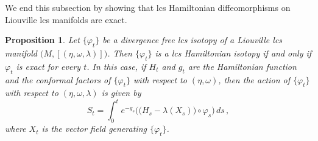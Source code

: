 \documentclass{amsart}
\newtheorem{prop}[thm]{Proposition}
\theoremstyle{remark}
\begin{document}
We end this subsection by showing that
lcs Hamiltonian diffeomorphisms
on Liouville lcs manifolds
are exact.

\begin{prop}\label{proposition: Hamiltonian vs exact}
Let $\{\varphi_t\}$ be a divergence free lcs isotopy
of a Liouville lcs manifold $\big(M, [(\eta, \omega, \lambda)]\big)$.
Then $\{\varphi_t\}$ is a lcs Hamiltonian isotopy
if and only if $\varphi_t$ is exact for every $t$.
In this case,
if $H_t$ and $g_t$ are the Hamiltonian function
and the conformal factors of $\{\varphi_t\}$
with respect to $(\eta, \omega)$,
then the action of $\{\varphi_t\}$
with respect to $(\eta, \omega, \lambda)$
is given by
\begin{equation}\label{equation: Hamiltonian function vs action}
S_t = \int_0^t e^{-g_s} \Big( \big(H_s - \lambda (X_s) \big) \circ \varphi_s \Big) \, ds \,,
\end{equation}
where $X_t$ is the vector field generating $\{\varphi_t\}$.
\end{prop}
\end{document}
